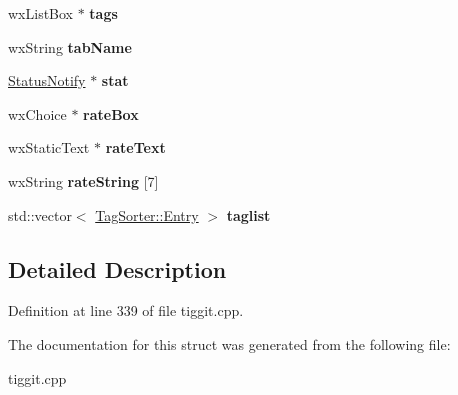 \begin{DoxyCompactItemize}
\item 
\hypertarget{struct_list_tab_ab890f6a57f3841ba918853aa2e87a5d4}{wx\-List\-Box $\ast$ {\bfseries tags}}\label{struct_list_tab_ab890f6a57f3841ba918853aa2e87a5d4}

\item 
\hypertarget{struct_list_tab_a1440cd81fe735ee69c052d9736d37c02}{wx\-String {\bfseries tab\-Name}}\label{struct_list_tab_a1440cd81fe735ee69c052d9736d37c02}

\item 
\hypertarget{struct_list_tab_a517e64070a34971184ce0b3845327045}{\hyperlink{struct_status_notify}{Status\-Notify} $\ast$ {\bfseries stat}}\label{struct_list_tab_a517e64070a34971184ce0b3845327045}

\item 
\hypertarget{struct_list_tab_a1df919aeb4e6e4dd48ab0da3292311fe}{wx\-Choice $\ast$ {\bfseries rate\-Box}}\label{struct_list_tab_a1df919aeb4e6e4dd48ab0da3292311fe}

\item 
\hypertarget{struct_list_tab_a0340593c73e4e54d9736c82dfc8ee6b5}{wx\-Static\-Text $\ast$ {\bfseries rate\-Text}}\label{struct_list_tab_a0340593c73e4e54d9736c82dfc8ee6b5}

\item 
\hypertarget{struct_list_tab_a25203a99208d6288ca3f54fe86936751}{wx\-String {\bfseries rate\-String} \mbox{[}7\mbox{]}}\label{struct_list_tab_a25203a99208d6288ca3f54fe86936751}

\item 
\hypertarget{struct_list_tab_af108fa3fbdbfd6932d24793bac2edfe7}{std\-::vector$<$ \hyperlink{struct_tag_sorter_1_1_entry}{Tag\-Sorter\-::\-Entry} $>$ {\bfseries taglist}}\label{struct_list_tab_af108fa3fbdbfd6932d24793bac2edfe7}

\end{DoxyCompactItemize}


\subsection{Detailed Description}


Definition at line 339 of file tiggit.\-cpp.



The documentation for this struct was generated from the following file\-:\begin{DoxyCompactItemize}
\item 
tiggit.\-cpp\end{DoxyCompactItemize}
